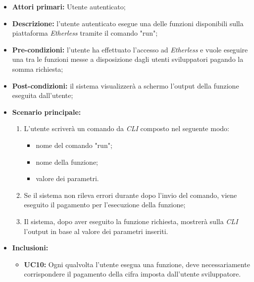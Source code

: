 \begin{itemize}
	\item \textbf{Attori primari:} Utente autenticato;
	\item \textbf{Descrizione:} l'utente autenticato esegue una delle funzioni disponibili sulla piattaforma \textit{Etherless} tramite il comando "run"; 
	\item \textbf{Pre-condizioni:} l'utente ha effettuato l'accesso ad \textit{Etherless} e vuole eseguire una tra le funzioni messe a disposizione dagli utenti sviluppatori pagando la somma richiesta;
	\item \textbf{Post-condizioni:} il sistema visualizzerà a schermo l'output della funzione eseguita dall'utente;
	\item \textbf{Scenario principale:} 
	\begin{enumerate}
		\item L'utente scriverà un comando da \textit{CLI\glo} composto nel seguente modo:
		\begin{itemize}
			\item nome del comando "run";
			\item nome della funzione;
			\item valore dei parametri.
		\end{itemize}
		\item Se il sistema non rileva errori durante dopo l'invio del comando, viene eseguito il pagamento per l'esecuzione della funzione;
		\item Il sistema, dopo aver eseguito la funzione richiesta, mostrerà sulla \textit{CLI\glo} l'output in base al valore dei parametri inseriti.
	\end{enumerate}
	\item \textbf{Inclusioni:} 
	\begin{itemize}
		\item \textbf{UC10:} Ogni qualvolta l'utente esegua una funzione, deve necessariamente corrispondere il pagamento della cifra imposta dall'utente sviluppatore.
	\end{itemize}
\end{itemize}